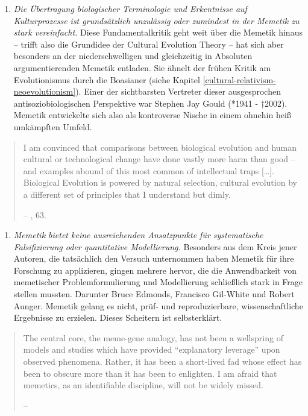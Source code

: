 \documentclass[openany,twoside,twocolumn]{book}
\providecommand{\tightlist}{%
  \setlength{\itemsep}{0pt}\setlength{\parskip}{0pt}}
\begin{document}
\begin{enumerate}
\def\labelenumi{\arabic{enumi}.}
\tightlist
\item
  \emph{Die Übertragung biologischer Terminologie und Erkentnisse auf
  Kulturprozesse ist grundsätzlich unzulässig oder zumindest in der
  Memetik zu stark vereinfacht.} Diese Fundamentalkritik geht weit über
  die Memetik hinaus -- trifft also die Grundidee der Cultural Evolution
  Theory -- hat sich aber besonders an der niederschwelligen und
  gleichzeitig in Absoluten argumentierenden Memetik entladen. Sie
  ähnelt der frühen Kritik am Evolutionismus durch die Boasianer (siehe
  Kapitel \ref{cultural-relativism-neoevolutionism}). Einer der
  sichtbarsten Vertreter dieser ausgesprochen antisoziobiologischen
  Perspektive war Stephen Jay Gould (*1941 - †2002). Memetik entwickelte
  sich also als kontroverse Nische in einem ohnehin heiß umkämpften
  Umfeld.
\end{enumerate}

\begin{quote}
I am convinced that comparisons between biological evolution and human
cultural or technological change have done vastly more harm than good --
and examples abound of this most common of intellectual traps
{[}\ldots{}{]}. Biological Evolution is powered by natural selection,
cultural evolution by a different set of principles that I understand
but dimly.

-- \textcite{gould_pandas_1991}, 63.
\end{quote}

\begin{enumerate}
\def\labelenumi{\arabic{enumi}.}
\setcounter{enumi}{1}
\tightlist
\item
  \emph{Memetik bietet keine ausreichenden Ansatzpunkte für
  systematische Falsifizierung oder quantitative Modellierung.}
  Besonders aus dem Kreis jener Autoren, die tatsächlich den Versuch
  unternommen haben Memetik für ihre Forschung zu applizieren, gingen
  mehrere hervor, die die Anwendbarkeit von memetischer
  Problemformulierung und Modellierung schließlich stark in Frage
  stellen mussten. Darunter Bruce Edmonds, Francisco Gil-White und
  Robert Aunger. Memetik gelang es nicht, prüf- und reproduzierbare,
  wissenschaftliche Ergebnisse zu erzielen. Dieses Scheitern ist
  selbsterklärt.
\end{enumerate}

\begin{quote}
The central core, the meme-gene analogy, has not been a wellspring of
models and studies which have provided ``explanatory leverage'' upon
observed phenomena. Rather, it has been a short-lived fad whose effect
has been to obscure more than it has been to enlighten. I am afraid that
memetics, as an identifiable discipline, will not be widely missed.

-- \textcite{edmonds_revealed_2005}
\end{quote}
\end{document}
